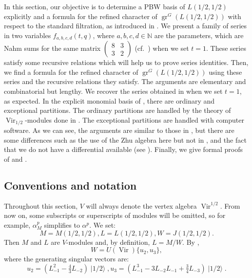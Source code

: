 \documentclass[a4paper, 12pt, reqno]{amsart}
\theoremstyle{remark}
\DeclareMathOperator{\Vir}{Vir}
\DeclareMathOperator{\gr}{gr}
\DeclareMathOperator{\vachalf}{|1/2\rangle}
\begin{document}
In this section, our objective is to determine a PBW basis of $L(1/2, 1/2)$ explicitly and a formula for the refined character of $\gr^G(L(1/2, 1/2))$ with respect to the standard filtration, as introduced in .
We present a family of series in two variables $f_{a, b, c, d}(t, q)$, where $a, b, c, d \in \mathbb{N}$ are the parameters, which are Nahm sums for the same matrix $\left(\begin{smallmatrix} 8 & 3 \\ 3 & 2 \end{smallmatrix}\right)$ (cf.\ \cite{Nahm2007}) when we set $t = 1$.
These series satisfy some recursive relations which will help us to prove series identities.
Then, we find a formula for the refined character of $\gr^G(L(1/2, 1/2))$ using these series and the recursive relations they satisfy.
The arguments are elementary and combinatorial but lengthy.
We recover the series obtained in \cite[Theorem 4]{andrews_singular_2022} when we set $t = 1$, as expected.
In the explicit monomial basis of , there are ordinary and exceptional partitions.
The ordinary partitions are handled by the theory of $\Vir_{1/2}$-modules done in .
The exceptional partitions are handled with computer software.
As we can see, the arguments are similar to those in \cite{andrews_singular_2022}, but there are some differences such as the use of the Zhu algebra here but not in \cite{andrews_singular_2022}, and the fact that we do not have a differential available (see ).
Finally, we give formal proofs of  and .

\subsection{Conventions and notation}
\label{sec:conventions-notation}

Throughout this section, $V$ will always denote the vertex algebra $\Vir^{1/2}$.
From now on, some subscripts or superscripts of modules will be omitted, so for example, $\alpha^p_M$ simplifies to $\alpha^p$.
We set:
\begin{equation*}
  M = M(1/2, 1/2), L = L(1/2, 1/2), W = J(1/2, 1/2).
\end{equation*}
Then $M$ and $L$ are $V$-modules and, by definition, $L = M/W$.
By ,
\begin{equation}
  \label{eq:47}
  W = U(\Vir)\{u_2, u_3\},
\end{equation}
where the generating singular vectors are:
\begin{equation}
  \label{eq:48}
  u_2 = (L_{-1}^2 - \tfrac{4}{3}L_{-2})\vachalf, u_3 = (L_{-1}^3 - 3L_{-2}L_{-1} + \tfrac{3}{4}L_{-3})\vachalf.
\end{equation}
\end{document}
